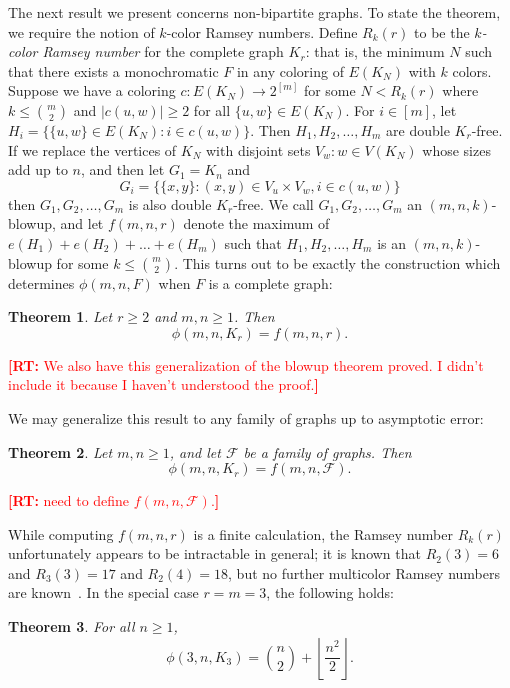 \documentclass[12pt]{article}
\newcommand{\rt}[1]{\textcolor{red}{\textbf{[RT: } #1\textbf{]}}}
\newtheorem{theorem}{Theorem}
\newcommand*{\F}{\mathcal{F}}
\begin{document}
The next result we present concerns non-bipartite graphs. To state the theorem, we require the notion of $k$-color Ramsey numbers. Define
$R_k(r)$ to be the \textit{$k$-color Ramsey number} for the complete graph $K_r$: that is, the minimum $N$ such that there exists a monochromatic $F$ in any coloring of $E(K_N)$ with $k$ colors. 
Suppose we have a coloring $c : E(K_N) \rightarrow 2^{[m]}$ for some $N < R_k(r)$ where $k \leq \binom{m}{2}$ and $|c(u,w)| \geq 2$ for all $\{u,w\} \in E(K_N)$. For $i \in [m]$, let $H_i = \{\{u,w\} \in E(K_N) : i \in c(u,w)\}$. Then $H_1,H_2,\dots,H_m$ are double $K_r$-free. If we replace the vertices of $K_N$ 
with disjoint sets $V_w : w \in V(K_N)$ whose sizes add up to $n$, and then let $G_1 = K_n$ and 
\[ G_i = \{\{x,y\} : (x,y) \in V_u \times V_w, i \in c(u,w)\} \]
then $G_1,G_2,\dots,G_m$ is also double $K_r$-free. We call $G_1,G_2,\dots,G_m$ an $(m,n,k)$-blowup, and 
let $f(m,n,r)$ denote the maximum of $e(H_1) + e(H_2) + \dots + e(H_m)$ such that $H_1,H_2,\dots,H_m$ is an $(m,n,k)$-blowup for some $k \leq \binom{m}{2}$. This turns out to be exactly the construction which determines $\phi(m,n,F)$ when $F$ is a complete graph: 

\begin{theorem}\label{thm:blowup}
Let $r \geq 2$ and $m,n \geq 1$. Then 
\[ \phi(m,n,K_r) = f(m,n,r).\]
\end{theorem}

\rt{We also have this generalization of the blowup theorem proved. I didn't include it because I haven't understood the proof.}

We may generalize this result to any family of graphs up to asymptotic error:

\begin{theorem}\label{thm:blowup-general}
  Let $m,n \geq 1$, and let $\F$ be a family of graphs. Then 
  \[ \phi(m,n,K_r) = f(m,n,\F).\]
\end{theorem}
\rt{need to define $f(m,n,\F)$.}

While computing $f(m,n,r)$ is a finite calculation, the Ramsey number $R_k(r)$ unfortunately appears to be intractable in general; it is known that $R_2(3) = 6$ and 
$R_3(3) = 17$ and $R_2(4) = 18$, but no further multicolor Ramsey numbers are known~\cite{ConlonFerber2021,Lefmann1987}. In the special case $r = m = 3$, the following holds: 

\begin{theorem}\label{thm:triangles}
  For all $n \geq 1$,
  \[
    \phi(3, n, K_3) = \binom{n}{2} + \left\lfloor \frac{n^2}{2} \right\rfloor.
  \]
\end{theorem}
\end{document}
